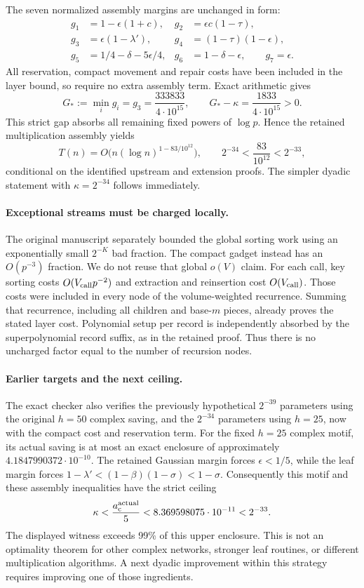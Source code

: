 \documentclass[11pt]{article}
\begin{document}
The seven normalized assembly margins are unchanged in form:
\begin{align*}
 g_1&=1-\epsilon(1+c),&g_2&=\epsilon c(1-\tau),\\
 g_3&=\epsilon(1-\lambda'),&g_4&=(1-\tau)(1-\epsilon),\\
 g_5&=1/4-\delta-5\epsilon/4,&g_6&=1-\delta-\epsilon,\qquad g_7=\epsilon.
\end{align*}
All reservation, compact movement and repair costs have been included in the
layer bound, so require no extra assembly term. Exact arithmetic gives
\[
 G_*:=\min_i g_i=g_3=\frac{333833}{4\cdot10^{15}},\qquad
 G_*-\kappa=\frac{1833}{4\cdot10^{15}}>0.
\]
This strict gap absorbs all remaining fixed powers of $\log p$. Hence the
retained multiplication assembly yields
\[
 T(n)=O\bigl(n(\log n)^{1-83/10^{12}}\bigr),\qquad
 2^{-34}<\frac{83}{10^{12}}<2^{-33},
\]
conditional on the identified upstream and extension proofs. The simpler
dyadic statement with $\kappa=2^{-34}$ follows immediately.

\paragraph{Exceptional streams must be charged locally.}
The original manuscript separately bounded the global sorting work using
an exponentially small $2^{-K}$ bad fraction. The compact gadget instead
has an $O(p^{-3})$ fraction. We do not reuse that global $o(V)$ claim.
For each call, key sorting costs $O(V_{\rm call}p^{-2})$ and extraction and
reinsertion cost $O(V_{\rm call})$. Those costs were included in every
node of the volume-weighted recurrence. Summing that recurrence, including
all children and base-$m$ pieces, already proves the stated layer cost.
Polynomial setup per record is independently absorbed by the superpolynomial
record suffix, as in the retained proof. Thus there is no uncharged factor
equal to the number of recursion nodes.

\paragraph{Earlier targets and the next ceiling.}
The exact checker also verifies the previously hypothetical $2^{-39}$
parameters using the original $h=50$ complex saving, and the $2^{-34}$
parameters using $h=25$, now with the compact cost and reservation term.
For the fixed $h=25$ complex motif, its actual saving is at most an exact
enclosure of approximately $4.1847990372\cdot10^{-10}$. The retained
Gaussian margin forces $\epsilon<1/5$, while the leaf margin forces
$1-\lambda'<(1-\beta)(1-\sigma)<1-\sigma$. Consequently this motif and
these assembly inequalities have the strict ceiling
\[
 \kappa<\frac{a_{\rm c}^{\rm actual}}5
       <8.369598075\cdot10^{-11}<2^{-33}.
\]
The displayed witness exceeds 99\% of this upper enclosure. This is not an
optimality theorem for other complex networks, stronger leaf routines, or
different multiplication algorithms. A next dyadic improvement within this
strategy requires improving one of those ingredients.
\end{document}
